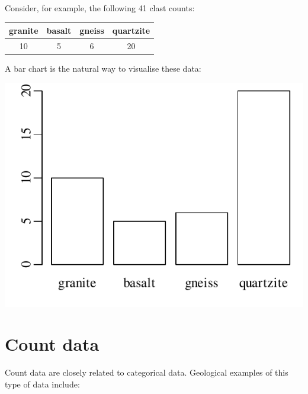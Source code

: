 Consider, for example, the following 41 clast counts:\\

\begin{center}
  \begin{tabular}{cccc}
    granite & basalt & gneiss & quartzite \\ \hline
    10 & 5 & 6 & 20  
  \end{tabular}
\end{center}

A bar chart is the natural way to visualise these data:\\

\noindent\begin{minipage}[t][][b]{.4\textwidth}
  \includegraphics[width=\textwidth]{../figures/clasts.pdf}
\end{minipage}
\begin{minipage}[t][][t]{.6\textwidth}
  \label{fig:clasts}
\end{minipage}

\section{Count data}
\label{sec:counts}

Count data are closely related to categorical data. Geological
examples of this type of data include:

